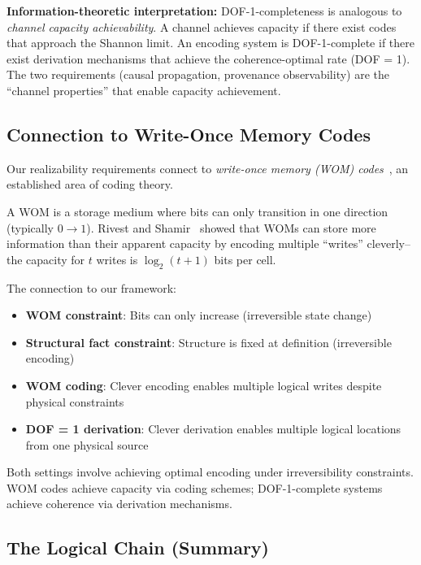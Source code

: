 \textbf{Information-theoretic interpretation:} DOF-1-completeness is analogous to \emph{channel capacity achievability}. A channel achieves capacity if there exist codes that approach the Shannon limit. An encoding system is DOF-1-complete if there exist derivation mechanisms that achieve the coherence-optimal rate (DOF = 1). The two requirements (causal propagation, provenance observability) are the ``channel properties'' that enable capacity achievement.

\subsection{Connection to Write-Once Memory Codes}\label{sec:wom-connection}

Our realizability requirements connect to \emph{write-once memory (WOM) codes}~\cite{rivest1982wom,wolf1984wom}, an established area of coding theory.

A WOM is a storage medium where bits can only transition in one direction (typically $0 \to 1$). Rivest and Shamir~\cite{rivest1982wom} showed that WOMs can store more information than their apparent capacity by encoding multiple ``writes'' cleverly--the capacity for $t$ writes is $\log_2(t+1)$ bits per cell.

The connection to our framework:
\begin{itemize}
\tightlist
\item \textbf{WOM constraint}: Bits can only increase (irreversible state change)
\item \textbf{Structural fact constraint}: Structure is fixed at definition (irreversible encoding)
\item \textbf{WOM coding}: Clever encoding enables multiple logical writes despite physical constraints
\item \textbf{DOF = 1 derivation}: Clever derivation enables multiple logical locations from one physical source
\end{itemize}

Both settings involve achieving optimal encoding under irreversibility constraints. WOM codes achieve capacity via coding schemes; DOF-1-complete systems achieve coherence via derivation mechanisms.

\subsection{The Logical Chain (Summary)}\label{sec:chain}

